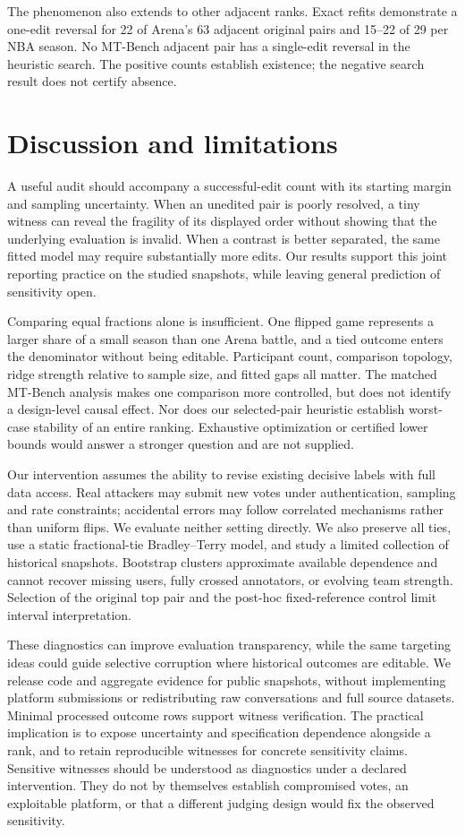The phenomenon also extends to other adjacent ranks. Exact refits demonstrate a one-edit reversal for 22 of Arena's 63 adjacent original pairs and 15--22 of 29 per NBA season. No MT-Bench adjacent pair has a single-edit reversal in the heuristic search. The positive counts establish existence; the negative search result does not certify absence.

\section{Discussion and limitations}
\label{sec:discussion}
A useful audit should accompany a successful-edit count with its starting margin and sampling uncertainty. When an unedited pair is poorly resolved, a tiny witness can reveal the fragility of its displayed order without showing that the underlying evaluation is invalid. When a contrast is better separated, the same fitted model may require substantially more edits. Our results support this joint reporting practice on the studied snapshots, while leaving general prediction of sensitivity open.

Comparing equal fractions alone is insufficient. One flipped game represents a larger share of a small season than one Arena battle, and a tied outcome enters the denominator without being editable. Participant count, comparison topology, ridge strength relative to sample size, and fitted gaps all matter. The matched MT-Bench analysis makes one comparison more controlled, but does not identify a design-level causal effect. Nor does our selected-pair heuristic establish worst-case stability of an entire ranking. Exhaustive optimization or certified lower bounds would answer a stronger question and are not supplied.

Our intervention assumes the ability to revise existing decisive labels with full data access. Real attackers may submit new votes under authentication, sampling and rate constraints; accidental errors may follow correlated mechanisms rather than uniform flips. We evaluate neither setting directly. We also preserve all ties, use a static fractional-tie Bradley--Terry model, and study a limited collection of historical snapshots. Bootstrap clusters approximate available dependence and cannot recover missing users, fully crossed annotators, or evolving team strength. Selection of the original top pair and the post-hoc fixed-reference control limit interval interpretation.

These diagnostics can improve evaluation transparency, while the same targeting ideas could guide selective corruption where historical outcomes are editable. We release code and aggregate evidence for public snapshots, without implementing platform submissions or redistributing raw conversations and full source datasets. Minimal processed outcome rows support witness verification. The practical implication is to expose uncertainty and specification dependence alongside a rank, and to retain reproducible witnesses for concrete sensitivity claims. Sensitive witnesses should be understood as diagnostics under a declared intervention. They do not by themselves establish compromised votes, an exploitable platform, or that a different judging design would fix the observed sensitivity.

